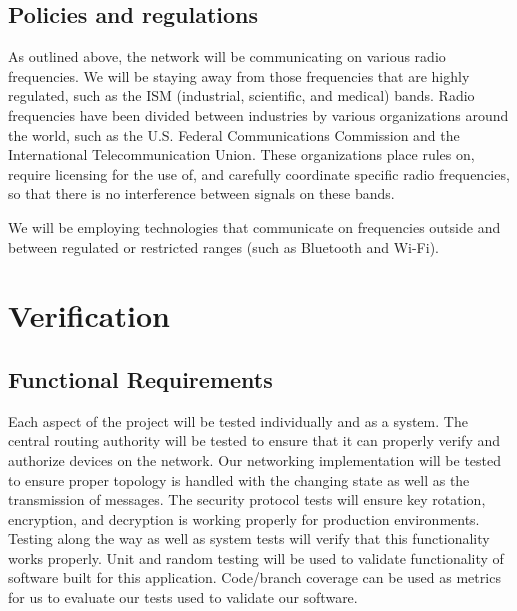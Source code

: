 \documentclass[tikz,a4paper,titlepage]{article}
\begin{document}


\subsection{Policies and regulations} %
As outlined above, the network will be communicating on various radio frequencies. We will be staying away from those frequencies that are highly regulated, such as the ISM (industrial, scientific, and medical) bands. Radio frequencies have been divided between industries by various organizations around the world, such as the U.S. Federal Communications Commission and the International Telecommunication Union. These organizations place rules on, require licensing for the use of, and carefully coordinate specific radio frequencies, so that there is no interference between signals on these bands.

We will be employing technologies that communicate on frequencies outside and between regulated or restricted ranges (such as Bluetooth and Wi-Fi).


\section{Verification}

\subsection{Functional Requirements}

Each aspect of the project will be tested individually and as a system. The central routing authority will be tested to ensure that it can properly verify and authorize devices on the network. Our networking implementation will be tested to ensure proper topology is handled with the changing state as well as the transmission of messages. The security protocol tests will ensure key rotation, encryption, and decryption is working properly for production environments. Testing along the way as well as system tests will verify that this functionality works properly. Unit and random testing will be used to validate functionality of software built for this application. Code/branch coverage can be used as metrics for us to evaluate our tests used to validate our software.
\end{document}

